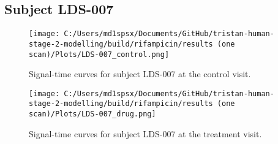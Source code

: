 \documentclass{epflreport}%
\begin{document}
\subsection{Subject LDS{-}007}%
\label{subsec:SubjectLDS{-}007}%

%


\begin{figure}[h!]%
\centering%
\texttt{[image: C:/Users/md1spsx/Documents/GitHub/tristan-human-stage-2-modelling/build/rifampicin/results (one scan)/Plots/LDS-007\_control.png]}%
\caption{Signal{-}time curves for subject LDS{-}007 at the control visit.}%
\end{figure}

%


\begin{figure}[h!]%
\centering%
\texttt{[image: C:/Users/md1spsx/Documents/GitHub/tristan-human-stage-2-modelling/build/rifampicin/results (one scan)/Plots/LDS-007\_drug.png]}%
\caption{Signal{-}time curves for subject LDS{-}007 at the treatment visit.}%
\end{figure}
\end{document}
